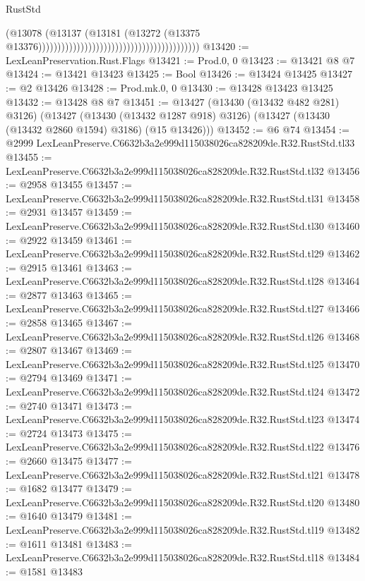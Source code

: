 \begin{lexlean}{RustStd}
\begin{coremodule}
                                                                              (@13078
                                                                                (@13137
                                                                                  (@13181
                                                                                    (@13272
                                                                                      (@13375
                                                                                        @13376))))))))))))))))))))))))))))))))))))))))))
@13420 := LexLeanPreservation.Rust.Flags
@13421 := Prod.{0, 0}
@13423 := @13421 @8 @7
@13424 := @13421 @13423
@13425 := Bool
@13426 := @13424 @13425
@13427 := @2 @13426
@13428 := Prod.mk.{0, 0}
@13430 := @13428 @13423 @13425
@13432 := @13428 @8 @7
@13451 := @13427
    (@13430 (@13432 @482 @281) @3126)
    (@13427
      (@13430 (@13432 @1287 @918) @3126)
      (@13427 (@13430 (@13432 @2860 @1594) @3186) (@15 @13426)))
@13452 := @6 @74
@13454 := @2999 LexLeanPreserve.C6632b3a2e999d115038026ca828209de.R32.RustStd.tl33
@13455 := LexLeanPreserve.C6632b3a2e999d115038026ca828209de.R32.RustStd.tl32
@13456 := @2958 @13455
@13457 := LexLeanPreserve.C6632b3a2e999d115038026ca828209de.R32.RustStd.tl31
@13458 := @2931 @13457
@13459 := LexLeanPreserve.C6632b3a2e999d115038026ca828209de.R32.RustStd.tl30
@13460 := @2922 @13459
@13461 := LexLeanPreserve.C6632b3a2e999d115038026ca828209de.R32.RustStd.tl29
@13462 := @2915 @13461
@13463 := LexLeanPreserve.C6632b3a2e999d115038026ca828209de.R32.RustStd.tl28
@13464 := @2877 @13463
@13465 := LexLeanPreserve.C6632b3a2e999d115038026ca828209de.R32.RustStd.tl27
@13466 := @2858 @13465
@13467 := LexLeanPreserve.C6632b3a2e999d115038026ca828209de.R32.RustStd.tl26
@13468 := @2807 @13467
@13469 := LexLeanPreserve.C6632b3a2e999d115038026ca828209de.R32.RustStd.tl25
@13470 := @2794 @13469
@13471 := LexLeanPreserve.C6632b3a2e999d115038026ca828209de.R32.RustStd.tl24
@13472 := @2740 @13471
@13473 := LexLeanPreserve.C6632b3a2e999d115038026ca828209de.R32.RustStd.tl23
@13474 := @2724 @13473
@13475 := LexLeanPreserve.C6632b3a2e999d115038026ca828209de.R32.RustStd.tl22
@13476 := @2660 @13475
@13477 := LexLeanPreserve.C6632b3a2e999d115038026ca828209de.R32.RustStd.tl21
@13478 := @1682 @13477
@13479 := LexLeanPreserve.C6632b3a2e999d115038026ca828209de.R32.RustStd.tl20
@13480 := @1640 @13479
@13481 := LexLeanPreserve.C6632b3a2e999d115038026ca828209de.R32.RustStd.tl19
@13482 := @1611 @13481
@13483 := LexLeanPreserve.C6632b3a2e999d115038026ca828209de.R32.RustStd.tl18
@13484 := @1581 @13483

\end{coremodule}
\end{lexlean}
